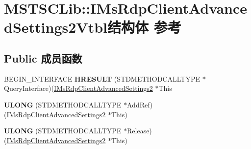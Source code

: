 \hypertarget{struct_m_s_t_s_c_lib_1_1_i_ms_rdp_client_advanced_settings2_vtbl}{}\section{M\+S\+T\+S\+C\+Lib\+:\+:I\+Ms\+Rdp\+Client\+Advanced\+Settings2\+Vtbl结构体 参考}
\label{struct_m_s_t_s_c_lib_1_1_i_ms_rdp_client_advanced_settings2_vtbl}
\subsection*{Public 成员函数}
\begin{DoxyCompactItemize}
\item 
\mbox{\label{struct_m_s_t_s_c_lib_1_1_i_ms_rdp_client_advanced_settings2_vtbl_a9f583df771ea071019fcd4f9a5e54730}} 
B\+E\+G\+I\+N\+\_\+\+I\+N\+T\+E\+R\+F\+A\+CE {\bfseries H\+R\+E\+S\+U\+LT} (S\+T\+D\+M\+E\+T\+H\+O\+D\+C\+A\+L\+L\+T\+Y\+PE $\ast$Query\+Interface)(\hyperlink{interface_m_s_t_s_c_lib_1_1_i_ms_rdp_client_advanced_settings2}{I\+Ms\+Rdp\+Client\+Advanced\+Settings2} $\ast$This
\item 
\mbox{\label{struct_m_s_t_s_c_lib_1_1_i_ms_rdp_client_advanced_settings2_vtbl_a8948e1406509429bc02426401f0cf809}} 
{\bfseries U\+L\+O\+NG} (S\+T\+D\+M\+E\+T\+H\+O\+D\+C\+A\+L\+L\+T\+Y\+PE $\ast$Add\+Ref)(\hyperlink{interface_m_s_t_s_c_lib_1_1_i_ms_rdp_client_advanced_settings2}{I\+Ms\+Rdp\+Client\+Advanced\+Settings2} $\ast$This)
\item 
\mbox{\label{struct_m_s_t_s_c_lib_1_1_i_ms_rdp_client_advanced_settings2_vtbl_a5ea9c9898699b97927bf939950c8e4ca}} 
{\bfseries U\+L\+O\+NG} (S\+T\+D\+M\+E\+T\+H\+O\+D\+C\+A\+L\+L\+T\+Y\+PE $\ast$Release)(\hyperlink{interface_m_s_t_s_c_lib_1_1_i_ms_rdp_client_advanced_settings2}{I\+Ms\+Rdp\+Client\+Advanced\+Settings2} $\ast$This)
\item 
\mbox{\label{struct_m_s_t_s_c_lib_1_1_i_ms_rdp_client_advanced_settings2_vtbl_acdf84462c836a8134c3e2ee21b1e44a1}} 

\end{DoxyCompactItemize}
